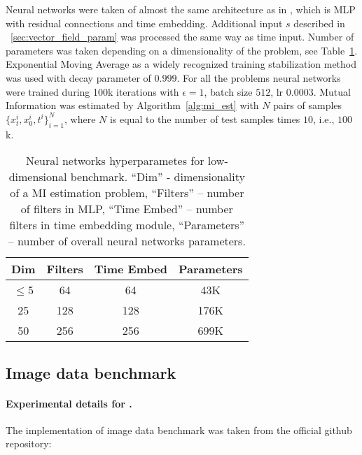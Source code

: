 Neural networks were taken of almost the same architecture as in \cite{franzese2024minde}, which is MLP with residual connections and time embedding. Additional input $s$ described in \wasyparagraph~\ref{sec:vector_field_param} was processed the same way as time input. Number of parameters was taken depending on a dimensionality of the problem, see Table~\ref{tab:low_dim_nn_params}. Exponential Moving Average as a widely recognized training stabilization method was used with decay parameter of $0.999$. For all the problems neural networks were trained during 100k iterations with $\epsilon=1$, batch size $512$, lr $0.0003$. Mutual Information was estimated by Algorithm~\ref{alg:mi_est} with $N$ pairs of samples $\{x_t^i, x_0^i, t^i\}_{i=1}^N$, where $N$ is equal to the number of test samples times $10$, i.e., $100$k.

\begin{table}[]
    \centering
    \small
        \begin{tabular}{ cccc } 
            \toprule
            Dim & Filters & Time Embed & Parameters \\
            \midrule
            $\leq$5  & 64 & 64 & 43K \\
            25  & 128 & 128 &  176K \\
            50  & 256 & 256 &  699K \\
            \bottomrule
        \end{tabular}
    \caption{Neural networks hyperparametes for low-dimensional \cite{czyz2023beyond_normal} benchmark. ``Dim'' - dimensionality of a MI estimation problem, ``Filters'' -- number of filters in MLP, ``Time Embed'' -- number filters in time embedding module, ``Parameters'' -- number of overall neural networks parameters. }
    \label{tab:low_dim_nn_params}
\end{table}

\subsection{Image data benchmark} \label{appendix:image_bench}

\paragraph{Experimental details for \ourestname{}.}

The implementation of \cite{butakov2024normflows} image data benchmark was taken from the official github repository:

